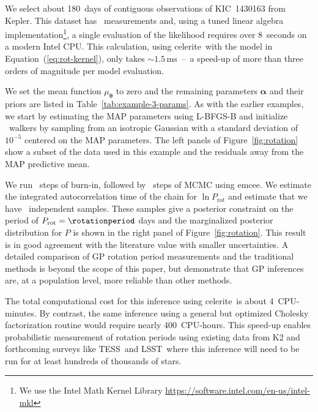 \documentclass[manuscript, letterpaper]{aastex6}
\newcommand{\project}[1]{\textsf{#1}}
\newcommand{\kepler}{\project{Kepler}}
\newcommand{\lsst}{\project{LSST}}
\newcommand{\tess}{\project{TESS}}
\newcommand{\celerite}{\project{celerite}}
\newcommand{\emcee}{\project{emcee}}
\newcommand{\figureref}[1]{\ref{fig:#1}}
\newcommand{\Figure}[1]{Figure~\figureref{#1}}
\renewcommand{\eqref}[1]{\ref{eq:#1}}
\newcommand{\Eq}[1]{Equation~(\eqref{#1})}
\newcommand{\eq}[1]{\Eq{#1}}
\newcommand{\bvec}[1]{{\ensuremath{\boldsymbol{#1}}}}
\newcommand{\response}[1]{{#1}}
\begin{document}
\response{We select about 180~days of contiguous observations of
    KIC~1430163 from \kepler.
    This dataset has \exampleiiindata\ measurements and, using a tuned linear
    algebra
    implementation\footnote{We use the Intel Math Kernel Library
        \url{https://software.intel.com/en-us/intel-mkl}}, a
    single evaluation of the likelihood requires over 8~seconds on a modern Intel
    CPU.
    This calculation, using \celerite\ with the model in \eq{rot-kernel}, only
    takes $\sim 1.5\,\mathrm{ms}$~--~a speed-up of more than three orders of
    magnitude per model evaluation. %

    We set the mean function $\mu_\bvec{\theta}$ to zero and the remaining
    parameters $\bvec{\alpha}$ and their priors are listed in
    Table~\ref{tab:example-3-params}.
    As with the earlier examples, we start by estimating the MAP parameters using
    \project{L-BFGS-B} and initialize \exampleiiinwalkers~walkers by sampling from
    an isotropic Gaussian with a standard deviation of $10^{-5}$ centered on the
    MAP parameters.
    The left panels of \Figure{rotation} show a subset of the data used in this
    example and the residuals away from the MAP predictive mean.

    We run \exampleiiinburn~steps of burn-in, followed by \exampleiiinsteps~steps
    of MCMC using \emcee.
    We estimate the integrated autocorrelation time of the chain for $\ln
        P_\mathrm{rot}$ and estimate that we have \exampleiiineff\ independent
    samples.
    These samples give a posterior constraint on the period of $P_\mathrm{rot} =
        \rotationperiod$ days and the marginalized posterior distribution for $P$ is
    shown in the right panel of \Figure{rotation}.
    This result is in good agreement with the literature value with smaller
    uncertainties.
    A detailed comparison of GP rotation period measurements and the traditional
    methods is beyond the scope of this paper, but \citet{Angus:2017} demonstrate
    that GP inferences are, at a population level, more reliable than other
    methods.

    The total computational cost for this inference using \celerite\ is about
    4~CPU-minutes.
    By contrast, the same inference using a general but optimized Cholesky
    factorization routine would require nearly 400~CPU-hours.
    This speed-up enables probabilistic measurement of rotation periods using
    existing data from \project{K2} and forthcoming surveys like \tess\ and \lsst\
    where this inference will need to be run for at least hundreds of thousands of
    stars.
}
\end{document}
